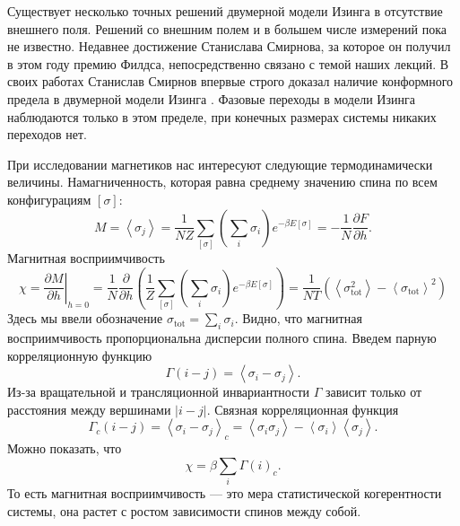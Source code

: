 \documentclass[a4paper,12pt]{article}
\theoremstyle{definition}
\theoremstyle{definition}
\theoremstyle{definition}
\begin{document}
Существует несколько точных решений двумерной модели Изинга в отсутствие внешнего поля. Решений со внешним полем и в большем числе измерений пока не известно. Недавнее достижение Станислава Смирнова, за которое он получил в этом году премию Филдса, непосредственно связано с темой наших лекций. В своих работах Станислав Смирнов впервые строго доказал наличие конформного предела в двумерной модели Изинга \cite{smirnov2007conformal,smirnov2001critical}.
Фазовые переходы в модели Изинга наблюдаются только в этом пределе, при конечных размерах системы никаких переходов нет.

При исследовании магнетиков нас интересуют следующие термодинамически величины.
Намагниченность, которая равна среднему значению спина по всем конфигурациям $[\sigma]$:
\begin{equation}
  \label{eq:7}
  M=\left<\sigma_j\right>=\frac{1}{NZ}\sum_{[\sigma]}\left(\sum_i\sigma_i\right)e^{-\beta E[\sigma]}=-\frac{1}{N}\frac{\partial F}{\partial h}.
\end{equation}
Магнитная восприимчивость
\begin{equation}
  \label{eq:8}
  \chi=\left.\frac{\partial M}{\partial h}\right|_{h=0}=\frac{1}{N}\frac{\partial}{\partial h}\left(\frac{1}{Z}\sum_{[\sigma]}\left(\sum_i \sigma_i\right)e^{-\beta E[\sigma]}\right)=\frac{1}{NT}\left(\left<\sigma_{\mathrm{tot}}^2\right>-\left<\sigma_{\mathrm{tot}}\right>^2\right)
\end{equation}
Здесь мы ввели обозначение $\sigma_{\mathrm{tot}}=\sum_i \sigma_i$. Видно, что магнитная восприимчивость пропорциональна дисперсии полного спина. Введем парную корреляционную функцию
\begin{equation}
  \label{eq:9}
  \Gamma(i-j)=\left<\sigma_i-\sigma_j\right>.
\end{equation}
Из-за вращательной и трансляционной инвариантности $\Gamma$ зависит только от расстояния между вершинами $\left|i-j\right|$. Связная корреляционная функция
\begin{equation}
  \label{eq:10}
  \Gamma_c(i-j)=\left<\sigma_i-\sigma_j\right>_c=\left<\sigma_i\sigma_j\right>-\left<\sigma_i\right>\left<\sigma_j\right>.
\end{equation}
Можно показать, что
\begin{equation}
  \label{eq:11}
  \chi=\beta\sum_i\Gamma(i)_c.
\end{equation}
То есть магнитная восприимчивость --- это мера статистической когерентности системы, она растет с ростом зависимости спинов между собой.
\end{document}
